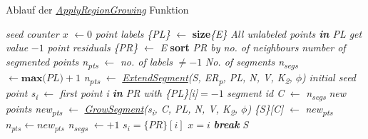\begin{algorithm}
	\caption{Ablauf der \textit{\hyperref[alg:apply_region_growing]{ApplyRegionGrowing}} Funktion}
	\label{alg:apply_region_growing}
	\begin{algorithmic}[1]
		\State \textit{seed counter $x$} $\gets 0$
		\State \textit{point labels \{PL\}} $\gets$ \textbf{size}\textit{\{E\}}
		\State \textit{All unlabeled points \textbf{in} PL get value }$-1$
		\State \textit{point residuals \{PR\}} $\gets$ \textit{E}
		\State \textbf{sort} \textit{PR by no. of neighbours}
		\State \textit{number of segmented points n\textsubscript{pts}} $\gets$ \textit{no. of labels} $\neq -1$
		\State \textit{No. of segments n\textsubscript{segs}} $\gets \textbf{max}\textit{(PL)} + 1$
		\State \textit{n\textsubscript{pts}} $\gets$ \textit{\hyperref[alg: extend_segments]{ExtendSegment}(S, ER\textsubscript{p}, PL, N, V, K\textsubscript{2}, $\phi$)}
		\State \textit{initial seed point s\textsubscript{i}} $\gets$ \textit{first point i \textbf{in} PR with \{PL\}[i]}$= -1$
		\State \textit{segment id C} $\gets$ \textit{n\textsubscript{segs}}
		\State \textit{new points new\textsubscript{pts}} $\gets$ \textit{\hyperref[alg:grow_segment]{GrowSegment}(s\textsubscript{i}, C, PL, N, V,  K\textsubscript{2}, $\phi$)}
		\State \textit{\{S\}[C]} $\gets$ \textit{new\textsubscript{pts}}
		\State $n_{pts} \gets new_{pts}$
		\State \textit{n\textsubscript{segs}} $\gets + 1$
		\State $s_i = \{PR\}[i]$
		\State $x = i$
		\State \textit{\textbf{break}}
		\EndIf
		\EndFor
		\EndWhile
		\State \Return \textit{S}
		\EndFunction
	\end{algorithmic}
\end{algorithm}

